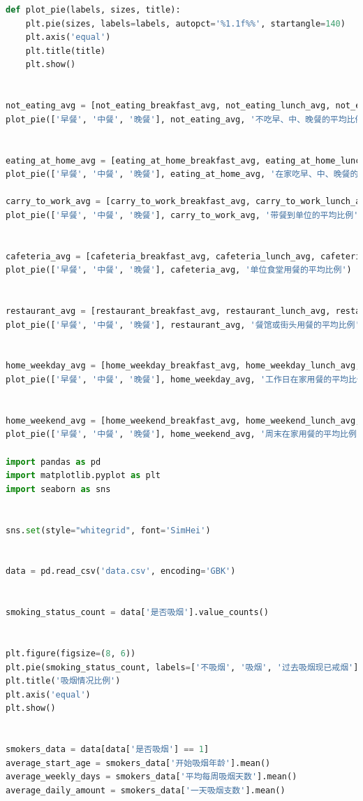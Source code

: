 \documentclass[withoutpreface,bwprint]{cumcmthesis} %
\begin{document}
\begin{appendices}
\begin{lstlisting}[language=python]
def plot_pie(labels, sizes, title):
    plt.pie(sizes, labels=labels, autopct='%1.1f%%', startangle=140)
    plt.axis('equal')
    plt.title(title)
    plt.show()


not_eating_avg = [not_eating_breakfast_avg, not_eating_lunch_avg, not_eating_dinner_avg]
plot_pie(['早餐', '中餐', '晚餐'], not_eating_avg, '不吃早、中、晚餐的平均比例')


eating_at_home_avg = [eating_at_home_breakfast_avg, eating_at_home_lunch_avg, eating_at_home_dinner_avg]
plot_pie(['早餐', '中餐', '晚餐'], eating_at_home_avg, '在家吃早、中、晚餐的平均比例')

carry_to_work_avg = [carry_to_work_breakfast_avg, carry_to_work_lunch_avg, carry_to_work_dinner_avg]
plot_pie(['早餐', '中餐', '晚餐'], carry_to_work_avg, '带餐到单位的平均比例')


cafeteria_avg = [cafeteria_breakfast_avg, cafeteria_lunch_avg, cafeteria_dinner_avg]
plot_pie(['早餐', '中餐', '晚餐'], cafeteria_avg, '单位食堂用餐的平均比例')


restaurant_avg = [restaurant_breakfast_avg, restaurant_lunch_avg, restaurant_dinner_avg]
plot_pie(['早餐', '中餐', '晚餐'], restaurant_avg, '餐馆或街头用餐的平均比例')


home_weekday_avg = [home_weekday_breakfast_avg, home_weekday_lunch_avg, home_weekday_dinner_avg]
plot_pie(['早餐', '中餐', '晚餐'], home_weekday_avg, '工作日在家用餐的平均比例')


home_weekend_avg = [home_weekend_breakfast_avg, home_weekend_lunch_avg, home_weekend_dinner_avg]
plot_pie(['早餐', '中餐', '晚餐'], home_weekend_avg, '周末在家用餐的平均比例')

import pandas as pd
import matplotlib.pyplot as plt
import seaborn as sns


sns.set(style="whitegrid", font='SimHei')


data = pd.read_csv('data.csv', encoding='GBK')


smoking_status_count = data['是否吸烟'].value_counts()


plt.figure(figsize=(8, 6))
plt.pie(smoking_status_count, labels=['不吸烟', '吸烟', '过去吸烟现已戒烟'], autopct='%1.1f%%', startangle=140, colors=sns.color_palette("pastel"))
plt.title('吸烟情况比例')
plt.axis('equal')
plt.show()


smokers_data = data[data['是否吸烟'] == 1]
average_start_age = smokers_data['开始吸烟年龄'].mean()
average_weekly_days = smokers_data['平均每周吸烟天数'].mean()
average_daily_amount = smokers_data['一天吸烟支数'].mean()



\end{lstlisting}
\end{appendices}
\end{document}
